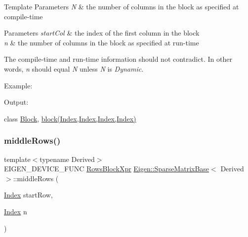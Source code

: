 \begin{DoxyTemplParams}{Template Parameters}
{\em N} & the number of columns in the block as specified at compile-\/time \\
\hline
\end{DoxyTemplParams}

\begin{DoxyParams}{Parameters}
{\em start\+Col} & the index of the first column in the block \\
\hline
{\em n} & the number of columns in the block as specified at run-\/time\\
\hline
\end{DoxyParams}
The compile-\/time and run-\/time information should not contradict. In other words, {\itshape n} should equal {\itshape N} unless {\itshape N} is {\itshape Dynamic}.

Example\+: 
\begin{DoxyCodeInclude}{0}
\end{DoxyCodeInclude}
 Output\+: 
\begin{DoxyVerbInclude}
\end{DoxyVerbInclude}
 class \mbox{\hyperlink{class_eigen_1_1_block}{Block}}, \mbox{\hyperlink{class_eigen_1_1_sparse_matrix_base_a7c28a2f511181c727396d5e813519d38}{block(\+Index,\+Index,\+Index,\+Index)}} \mbox{\label{class_eigen_1_1_sparse_matrix_base_aa06954a6c3a27447c4a401f1bfc0fc3a}} 
\subsubsection{\texorpdfstring{middleRows()}{middleRows()}\hspace{0.1cm}{\footnotesize\ttfamily [1/2]}}
{\footnotesize\ttfamily template$<$typename Derived$>$ \\
E\+I\+G\+E\+N\+\_\+\+D\+E\+V\+I\+C\+E\+\_\+\+F\+U\+NC \mbox{\hyperlink{class_eigen_1_1_block}{Rows\+Block\+Xpr}} \mbox{\hyperlink{class_eigen_1_1_sparse_matrix_base}{Eigen\+::\+Sparse\+Matrix\+Base}}$<$ Derived $>$\+::middle\+Rows (\begin{DoxyParamCaption}\item[{\mbox{\hyperlink{struct_eigen_1_1_eigen_base_a554f30542cc2316add4b1ea0a492ff02}{Index}}}]{start\+Row,  }\item[{\mbox{\hyperlink{struct_eigen_1_1_eigen_base_a554f30542cc2316add4b1ea0a492ff02}{Index}}}]{n }\end{DoxyParamCaption})\hspace{0.3cm}{\ttfamily [inline]}}

